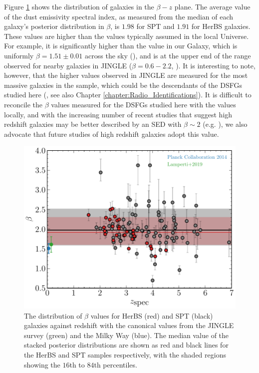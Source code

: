 Figure \ref{fig:beta_z_evolution} shows the distribution of galaxies in the $\beta-z$ plane. The average value of the dust emissivity spectral index, as measured from the median of each galaxy's posterior distribution in $\beta$, is $1.98$ for SPT and $1.91$ for HerBS galaxies. These values are higher than the values typically assumed in the local Universe. For example, it is significantly higher than the value in our Galaxy, which is uniformly $\beta = 1.51\pm0.01$ across the sky (\citealt{Planck_Collaboration_2015}), and is at the upper end of the range observed for nearby galaxies in JINGLE ($\beta = 0.6 - 2.2$, \citealt{Lamperti_2019}). It is interesting to note, however, that the higher values observed in JINGLE are measured for the most massive galaxies in the sample, which could be the descendants of the DSFGs studied here (\citealt{Eales_2023}, see also Chapter \ref{chapter:Radio_Identifications}). It is difficult to reconcile the $\beta$ values measured for the DSFGs studied here with the values locally, and with the increasing number of recent studies that suggest high redshift galaxies may be better described by an SED with $\beta \sim 2$ (e.g. \citealt{daCunha_2021, Witstok_2023}), we also advocate that future studies of high redshift galaxies adopt this value.

\begin{figure}
	\centering
	\includegraphics[width=0.76\columnwidth]{Figures/beta_evolution.pdf}
	\caption[Distribution of HerBS and SPT galaxies in the $\beta$ - redshift plane]{The distribution of $\beta$ values for HerBS (red) and SPT (black) galaxies against redshift with the canonical values from the JINGLE survey (green) and the Milky Way (blue). The median value of the stacked posterior distributions are shown as red and black lines for the HerBS and SPT samples respectively, with the shaded regions showing the $16$th to $84$th percentiles.}
	\label{fig:beta_z_evolution}
\end{figure}

